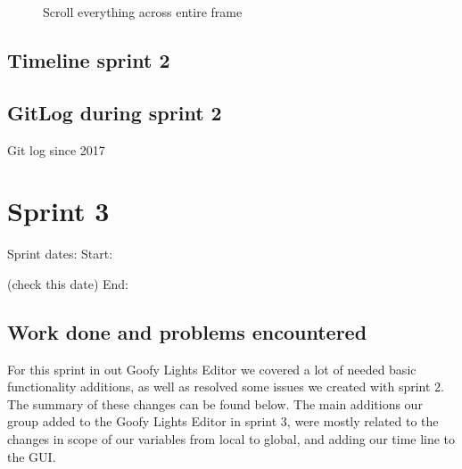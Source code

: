 \documentclass[11pt]{article} %
\begin{document}
\begin{figure}[H]
	\centering
	\caption{Scroll everything across entire frame}
	\label{fig:UC14}
\end{figure}

\newpage
\subsection{Timeline sprint 2}


\newpage
\subsection{GitLog during sprint 2}
Git log since 2017


\newpage
\section{Sprint 3}
Sprint dates:  Start: \date{4/11/2017}(check this date)    End: \date{4/19/2017}

\subsection{Work done and problems encountered}
For this sprint in out Goofy Lights Editor we covered a lot of needed basic functionality additions, as well as resolved some issues we created with sprint 2. The summary of these changes can be found below.
The main additions our group added to the Goofy Lights Editor in sprint 3, were mostly related to the changes in scope of our variables from local to global, and adding our time line to the GUI.
\end{document}
